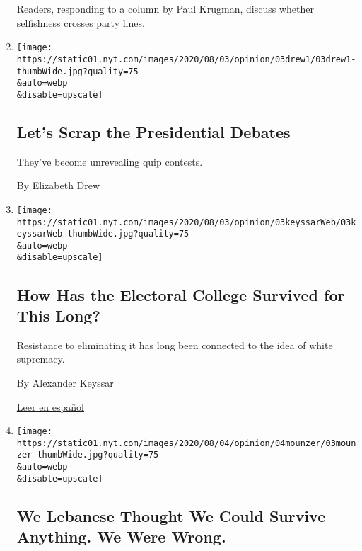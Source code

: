 \begin{enumerate}
  Readers, responding to a column by Paul Krugman, discuss whether
  selfishness crosses party lines.
\item
  \href{/2020/08/03/opinion/trump-biden-presidential-debates-2020.html}{}

  \texttt{[image: https://static01.nyt.com/images/2020/08/03/opinion/03drew1/03drew1-thumbWide.jpg?quality=75\\\&auto=webp\\\&disable=upscale]}

  \hypertarget{lets-scrap-the-presidential-debates}{%
  \subsection{Let's Scrap the Presidential
  Debates}\label{lets-scrap-the-presidential-debates}}

  They've become unrevealing quip contests.

  By Elizabeth Drew
\item
  \href{/2020/08/03/opinion/electoral-college-racism-white-supremacy.html}{}

  \texttt{[image: https://static01.nyt.com/images/2020/08/03/opinion/03keyssarWeb/03keyssarWeb-thumbWide.jpg?quality=75\\\&auto=webp\\\&disable=upscale]}

  \hypertarget{how-has-the-electoral-college-survived-for-this-long}{%
  \subsection{How Has the Electoral College Survived for This
  Long?}\label{how-has-the-electoral-college-survived-for-this-long}}

  Resistance to eliminating it has long been connected to the idea of
  white supremacy.

  By Alexander Keyssar

  \href{https://www.nytimes.com/es/2020/08/03/espanol/opinion/colegio-electoral-estados-unidos.html}{Leer
  en español}
\item
  \href{/2020/08/03/opinion/lebanon-coronavirus-economy.html}{}

  \texttt{[image: https://static01.nyt.com/images/2020/08/04/opinion/04mounzer/03mounzer-thumbWide.jpg?quality=75\\\&auto=webp\\\&disable=upscale]}

  \hypertarget{we-lebanese-thought-we-could-survive-anything-we-were-wrong}{%
  \subsection{We Lebanese Thought We Could Survive Anything. We Were
  Wrong.}\label{we-lebanese-thought-we-could-survive-anything-we-were-wrong}}


\end{enumerate}

